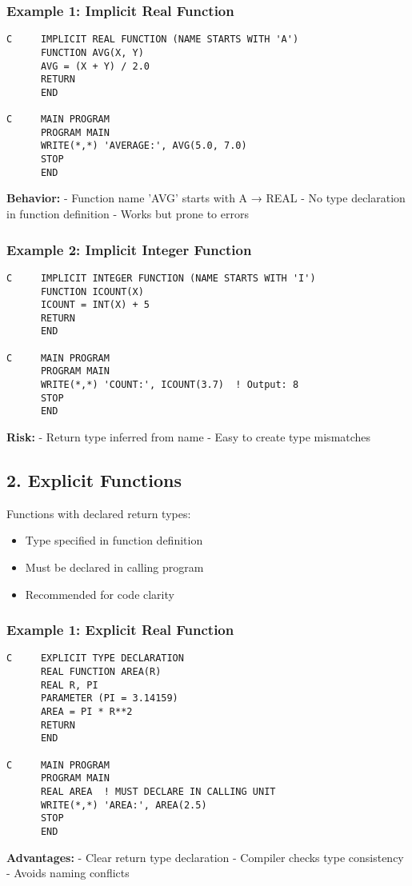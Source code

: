 \documentclass{book}
\begin{document}
\subsubsection*{Example 1: Implicit Real Function}
\begin{verbatim}
C     IMPLICIT REAL FUNCTION (NAME STARTS WITH 'A')
      FUNCTION AVG(X, Y)
      AVG = (X + Y) / 2.0
      RETURN
      END

C     MAIN PROGRAM
      PROGRAM MAIN
      WRITE(*,*) 'AVERAGE:', AVG(5.0, 7.0)
      STOP
      END
\end{verbatim}
\textbf{Behavior:}
- Function name 'AVG' starts with A → REAL
- No type declaration in function definition
- Works but prone to errors

\subsubsection*{Example 2: Implicit Integer Function}
\begin{verbatim}
C     IMPLICIT INTEGER FUNCTION (NAME STARTS WITH 'I')
      FUNCTION ICOUNT(X)
      ICOUNT = INT(X) + 5
      RETURN
      END

C     MAIN PROGRAM
      PROGRAM MAIN
      WRITE(*,*) 'COUNT:', ICOUNT(3.7)  ! Output: 8
      STOP
      END
\end{verbatim}
\textbf{Risk:}
- Return type inferred from name
- Easy to create type mismatches

\subsection*{2. Explicit Functions}
Functions with declared return types:
\begin{itemize}
\item Type specified in function definition
\item Must be declared in calling program
\item Recommended for code clarity
\end{itemize}

\subsubsection*{Example 1: Explicit Real Function}
\begin{verbatim}
C     EXPLICIT TYPE DECLARATION
      REAL FUNCTION AREA(R)
      REAL R, PI
      PARAMETER (PI = 3.14159)
      AREA = PI * R**2
      RETURN
      END

C     MAIN PROGRAM
      PROGRAM MAIN
      REAL AREA  ! MUST DECLARE IN CALLING UNIT
      WRITE(*,*) 'AREA:', AREA(2.5)
      STOP
      END
\end{verbatim}
\textbf{Advantages:}
- Clear return type declaration
- Compiler checks type consistency
- Avoids naming conflicts
\end{document}
